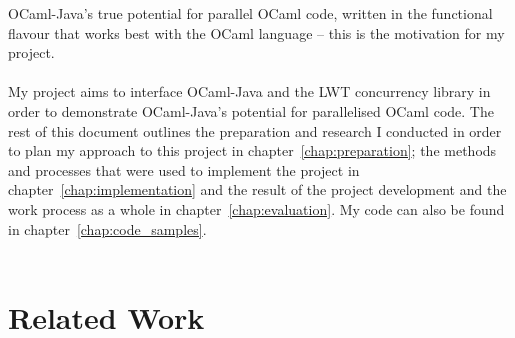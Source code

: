 \documentclass[12pt,twoside,notitlepage]{report}
\begin{document}
OCaml-Java's true potential for parallel OCaml code, written in the functional flavour that works best with the OCaml language -- this is the motivation for my project.
\\
\\
%
%
My project aims to interface OCaml-Java and the LWT concurrency library in order to demonstrate OCaml-Java's potential for parallelised OCaml code. The rest of this document outlines the preparation and research I conducted in order
to plan my approach to this project in chapter~\ref{chap:preparation}; the methods and processes that were used to implement the project in chapter~\ref{chap:implementation} and the result of the project development and the work
process as a whole in chapter~\ref{chap:evaluation}. My code can also be found in chapter~\ref{chap:code_samples}.
\\
\\
%
%
\section{Related Work}
\label{sec:related_work}
\end{document}

